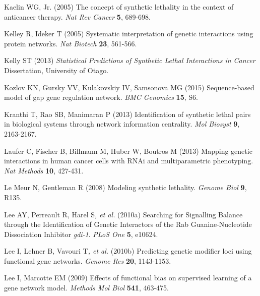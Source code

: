 \hypertarget{ENREF55}{}Kaelin WG, Jr. (2005) The concept of synthetic
lethality in the context of anticancer therapy. \textit{Nat Rev Cancer}
\textbf{5}, 689-698.



\hypertarget{ENREF56}{}Kelley R, Ideker T (2005) Systematic
interpretation of genetic interactions using protein networks.
\textit{Nat Biotech} \textbf{23}, 561-566.



Kelly ST (2013) \textit{Statistical Predictions of Synthetic Lethal
Interactions in Cancer} Dissertation, University of Otago.



\hypertarget{ENREF58}{}Kozlov KN, Gursky VV, Kulakovskiy IV, Samsonova
MG (2015) Sequence-based model of gap gene regulation network.
\textit{BMC Genomics} \textbf{15}, S6.



\hypertarget{ENREF59}{}Kranthi T, Rao SB, Manimaran P (2013)
Identification of synthetic lethal pairs in biological systems through
network information centrality. \textit{Mol Biosyst} \textbf{9},
2163-2167.



\hypertarget{ENREF60}{}Laufer C, Fischer B, Billmann M, Huber W, Boutros
M (2013) Mapping genetic interactions in human cancer cells with RNAi
and multiparametric phenotyping. \textit{Nat Methods} \textbf{10},
427-431.



\hypertarget{ENREF61}{}Le Meur N, Gentleman R (2008) Modeling synthetic
lethality. \textit{Genome Biol} \textbf{9}, R135.



\hypertarget{ENREF62}{}Lee AY, Perreault R, Harel S\textit{, et al.}
(2010a) Searching for Signalling Balance through the Identification of
Genetic Interactors of the Rab Guanine-Nucleotide Dissociation
Inhibitor \textit{gdi-1}. \textit{PLoS One} \textbf{5}, e10624.



\hypertarget{ENREF63}{}Lee I, Lehner B, Vavouri T\textit{, et al.}
(2010b) Predicting genetic modifier loci using functional gene
networks. \textit{Genome Res} \textbf{20}, 1143-1153.



\hypertarget{ENREF64}{}Lee I, Marcotte EM (2009) Effects of functional
bias on supervised learning of a gene network model. \textit{Methods
Mol Biol} \textbf{541}, 463-475.



